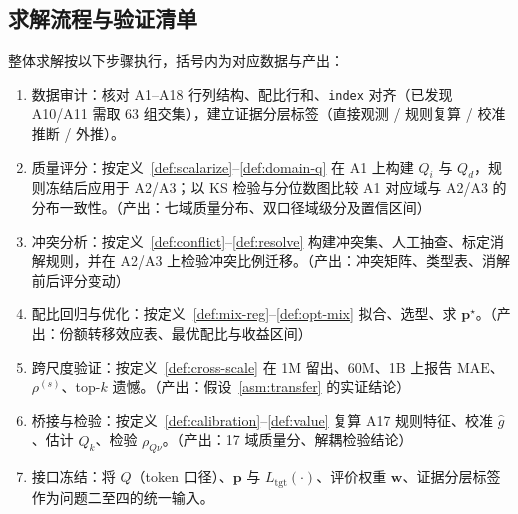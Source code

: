 \subsection{求解流程与验证清单}\label{sec:p1-pipeline}

整体求解按以下步骤执行，括号内为对应数据与产出：

\begin{enumerate}
  \item 数据审计：核对 A1--A18 行列结构、配比行和、\texttt{index} 对齐（已发现 A10/A11 需取 63 组交集），建立证据分层标签（直接观测 / 规则复算 / 校准推断 / 外推）。
  \item 质量评分：按定义~\ref{def:scalarize}--\ref{def:domain-q} 在 A1 上构建 $Q_i$ 与 $Q_d$，规则冻结后应用于 A2/A3；以 KS 检验与分位数图比较 A1 对应域与 A2/A3 的分布一致性。（产出：七域质量分布、双口径域级分及置信区间）
  \item 冲突分析：按定义~\ref{def:conflict}--\ref{def:resolve} 构建冲突集、人工抽查、标定消解规则，并在 A2/A3 上检验冲突比例迁移。（产出：冲突矩阵、类型表、消解前后评分变动）
  \item 配比回归与优化：按定义~\ref{def:mix-reg}--\ref{def:opt-mix} 拟合、选型、求 $\bm{p}^\star$。（产出：份额转移效应表、最优配比与收益区间）
  \item 跨尺度验证：按定义~\ref{def:cross-scale} 在 1M 留出、60M、1B 上报告 $\mathrm{MAE}$、$\rho^{(s)}$、top-$k$ 遗憾。（产出：假设~\ref{asm:transfer} 的实证结论）
  \item 桥接与检验：按定义~\ref{def:calibration}--\ref{def:value} 复算 A17 规则特征、校准 $\hat g$、估计 $\widehat Q_k$、检验 $\rho_{Q\nu}$。（产出：17 域质量分、解耦检验结论）
  \item 接口冻结：将 $Q$（token 口径）、$\bm{p}$ 与 $L_{\mathrm{tgt}}(\cdot)$、评价权重 $\bm{w}$、证据分层标签作为问题二至四的统一输入。
\end{enumerate}
